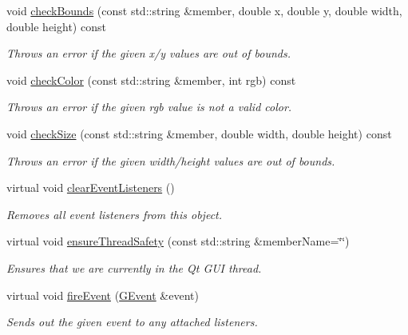 \begin{DoxyCompactItemize}
\item 
void \mbox{\hyperlink{classGDrawingSurface_a3a690bcb2d62250c9e4722ad7c1b9ab6}{check\+Bounds}} (const std\+::string \&member, double x, double y, double width, double height) const
\begin{DoxyCompactList}\small\item\em Throws an error if the given x/y values are out of bounds. \end{DoxyCompactList}\item 
void \mbox{\hyperlink{classGDrawingSurface_a9841b5dc607ca41a14819d80e1d8a09c}{check\+Color}} (const std\+::string \&member, int rgb) const
\begin{DoxyCompactList}\small\item\em Throws an error if the given rgb value is not a valid color. \end{DoxyCompactList}\item 
void \mbox{\hyperlink{classGDrawingSurface_a70a6546707ae708573396616bd0f5320}{check\+Size}} (const std\+::string \&member, double width, double height) const
\begin{DoxyCompactList}\small\item\em Throws an error if the given width/height values are out of bounds. \end{DoxyCompactList}\item 
virtual void \mbox{\hyperlink{classGObservable_a80cfa040459ff53594adbd6a51ec8f43}{clear\+Event\+Listeners}} ()
\begin{DoxyCompactList}\small\item\em Removes all event listeners from this object. \end{DoxyCompactList}\item 
virtual void \mbox{\hyperlink{classGObservable_a284f31528c0520f8e545c03ac9eeac74}{ensure\+Thread\+Safety}} (const std\+::string \&member\+Name=\char`\"{}\char`\"{})
\begin{DoxyCompactList}\small\item\em Ensures that we are currently in the Qt G\+UI thread. \end{DoxyCompactList}\item 
virtual void \mbox{\hyperlink{classGObservable_a63e5e5a6227c59c928493b11aceb0f67}{fire\+Event}} (\mbox{\hyperlink{classGEvent}{G\+Event}} \&event)
\begin{DoxyCompactList}\small\item\em Sends out the given event to any attached listeners. \end{DoxyCompactList}\item 

\end{DoxyCompactItemize}
